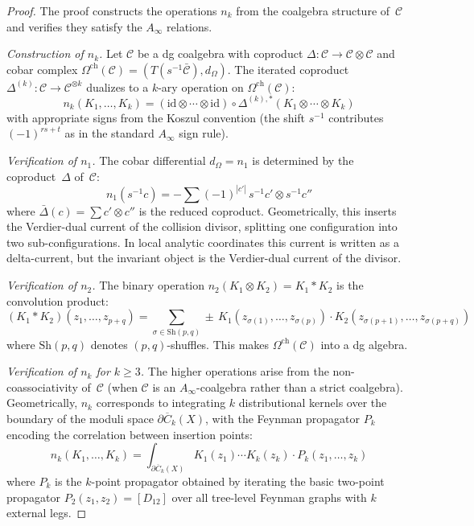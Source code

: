 \begin{proof}
The proof constructs the operations $n_k$ from the coalgebra structure of~$\mathcal{C}$ and verifies they satisfy the $A_\infty$ relations.

\emph{Construction of $n_k$.}
Let $\mathcal{C}$ be a dg coalgebra with coproduct $\Delta: \mathcal{C} \to \mathcal{C} \otimes \mathcal{C}$ and cobar complex $\Omega^{\mathrm{ch}}(\mathcal{C}) = (T(s^{-1}\bar{\mathcal{C}}), d_\Omega)$. The iterated coproduct $\Delta^{(k)}: \mathcal{C} \to \mathcal{C}^{\otimes k}$ dualizes to a $k$-ary operation on $\Omega^{\mathrm{ch}}(\mathcal{C})$:
\begin{equation}\label{eq:nk-from-coproduct}
n_k(K_1, \ldots, K_k) = (\mathrm{id} \otimes \cdots \otimes \mathrm{id}) \circ \Delta^{(k),*}(K_1 \otimes \cdots \otimes K_k)
\end{equation}
with appropriate signs from the Koszul convention (the shift $s^{-1}$ contributes $(-1)^{rs+t}$ as in the standard $A_\infty$ sign rule).

\emph{Verification of $n_1$.}
The cobar differential $d_\Omega = n_1$ is determined by the coproduct~$\Delta$ of~$\mathcal{C}$:
\[
n_1(s^{-1}c) = -\sum (-1)^{|c'|}\, s^{-1}c' \otimes s^{-1}c''
\]
where $\bar{\Delta}(c) = \sum c' \otimes c''$ is the reduced
coproduct. Geometrically, this inserts the Verdier-dual current of
the collision divisor, splitting one configuration into two
sub-configurations. In local analytic coordinates this current is
written as a delta-current, but the invariant object is the
Verdier-dual current of the divisor.

\emph{Verification of $n_2$.}
The binary operation $n_2(K_1 \otimes K_2) = K_1 * K_2$ is the convolution product:
\[
(K_1 * K_2)(z_1, \ldots, z_{p+q}) = \sum_{\sigma \in \mathrm{Sh}(p,q)} \pm\, K_1(z_{\sigma(1)}, \ldots, z_{\sigma(p)}) \cdot K_2(z_{\sigma(p+1)}, \ldots, z_{\sigma(p+q)})
\]
where $\mathrm{Sh}(p,q)$ denotes $(p,q)$-shuffles. This makes $\Omega^{\mathrm{ch}}(\mathcal{C})$ into a dg algebra.

\emph{Verification of $n_k$ for $k \geq 3$.}
The higher operations arise from the non-coassociativity of~$\mathcal{C}$ (when $\mathcal{C}$ is an $A_\infty$-coalgebra rather than a strict coalgebra). Geometrically, $n_k$ corresponds to integrating $k$ distributional kernels over the boundary of the moduli space $\partial\overline{C}_k(X)$, with the Feynman propagator $P_k$ encoding the correlation between insertion points:
\[
n_k(K_1, \ldots, K_k) = \int_{\partial \overline{C}_k(X)} K_1(z_1) \cdots K_k(z_k) \cdot P_k(z_1, \ldots, z_k)
\]
where $P_k$ is the $k$-point propagator obtained by iterating the basic
two-point propagator $P_2(z_1, z_2) = [D_{12}]$ over all tree-level
Feynman graphs with $k$ external legs.


\end{proof}
